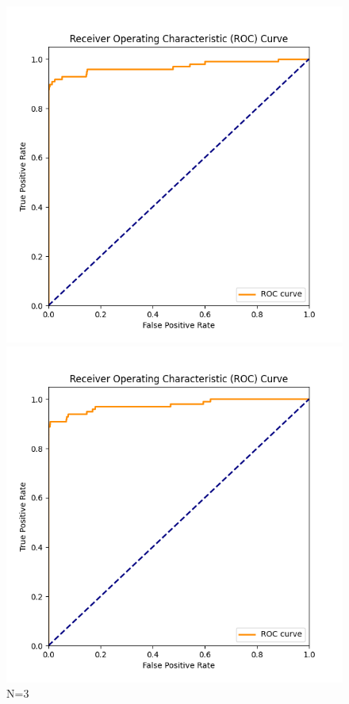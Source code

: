 \documentclass[8pt]{article}
\begin{document}
\begin{figure}[H]
    \centering
    \begin{minipage}{0.24\textwidth}
        \centering
        \includegraphics[width=\textwidth]{../Prob1/out/rand_seed_14/task3/roc_curve_N_3_K_7.png}
        \caption{N=3}
        \label{fig:roc_curve_N_3_K_7}
    \end{minipage}
    \begin{minipage}{0.24\textwidth}
        \centering
        \includegraphics[width=\textwidth]{../Prob1/out/rand_seed_14/task3/roc_curve_N_5_K_7.png}

\end{minipage}
\end{figure}
\end{document}
